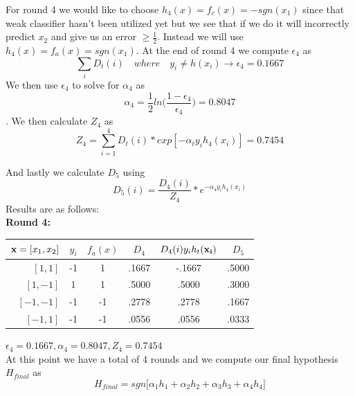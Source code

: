 \documentclass[11pt,a4paper]{article}
\begin{document}
\begin{itemize}
			For round 4 we would like to choose $h_4(x) = f_c(x) = -sgn(x_1)$ since that weak classifier hasn't been utilized yet but we see that if we do it will incorrectly predict $x_2$ and give us an error $\geq \frac{1}{2}$. Instead we will use $h_4(x) = f_a(x) = sgn(x_1)$.  At the end of round 4 we compute $\epsilon_4$ as $$\displaystyle\sum_{i} D_t (i) \quad where \quad y_i \neq h(x_i) \rightarrow \epsilon_4 = 0.1667$$ We then use $\epsilon_4$ to solve for $\alpha_4$ as $$\alpha_4 = \frac{1}{2} ln \Big( \frac{1-\epsilon_4}{\epsilon_4} \Big) = 0.8047$$. We then calculate $Z_4$ as $$Z_4 = \displaystyle\sum_{i=1}^4 D_t(i)*exp[-\alpha_t y_i h_4(x_i)] = 0.7454$$
			
			And lastly we calculate $D_5$ using $$D_5(i) = \frac{D_4(i)}{Z_4}*e^{-\alpha_4 y_i h_4(x_i)}$$ Results are as follows:\\
			
			\textbf{Round 4:}
			\begin{center}
				\begin{tabular}{rccccc}
					\toprule
					${\bf x} = [x_1,x_2]$ & $y_i$ & $f_a(x)$ & $D_4$ & $D_{4}(i)y_{i}h_t({\bf x_i})$ & $D_5$ \\
					\midrule
					$[1,  1]$             & -1    & 1        & .1667 & -.1667                        & .5000      \\
					$[1, -1]$             & 1     & 1        & .5000 & .5000                         & .3000      \\
					$[-1,-1]$             & -1    & -1       & .2778 & .2778                         & .1667      \\
					$[-1, 1]$             & -1    & -1       & .0556 & .0556                         & .0333      \\
					\bottomrule
				\end{tabular}
			\end{center}
			$\epsilon_4 = 0.1667, \alpha_4 = 0.8047, Z_4 = 0.7454$ \\
			
			At this point we have a total of 4 rounds and we compute our final hypothesis $H_{final}$ as
			$$ H_{final} = sgn \Big[ \alpha_1 h_1 + \alpha_2 h_2 + \alpha_3 h_3 + \alpha_4 h_4 \Big]$$
		\end{itemize}
	
\end{document}
